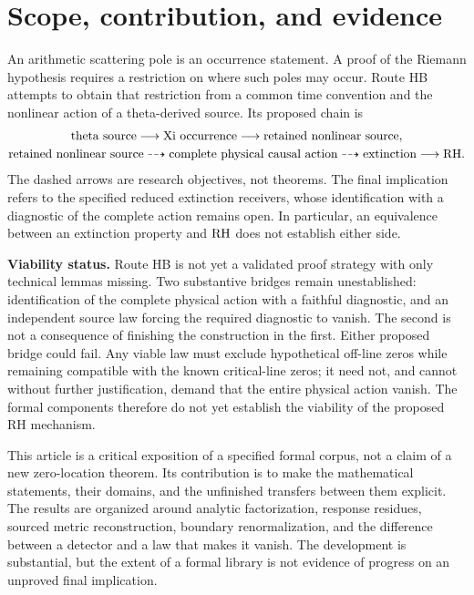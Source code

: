 \section{Scope, contribution, and evidence}

An arithmetic scattering pole is an occurrence statement. A proof of the Riemann hypothesis requires a restriction on where such poles may occur. Route HB attempts to obtain that restriction from a common time convention and the nonlinear action of a theta-derived source. Its proposed chain is
\[
\begin{gathered}
\text{theta source}\longrightarrow\text{Xi occurrence}
\longrightarrow\text{retained nonlinear source},\\
\text{retained nonlinear source}\dashrightarrow\text{complete physical causal action}
\dashrightarrow\text{extinction}\longrightarrow\mathrm{RH}.
\end{gathered}
\]
The dashed arrows are research objectives, not theorems. The final implication refers to the specified reduced extinction receivers, whose identification with a diagnostic of the complete action remains open. In particular, an equivalence between an extinction property and \(\mathrm{RH}\) does not establish either side.

\textbf{Viability status.} Route HB is not yet a validated proof strategy with only technical lemmas missing. Two substantive bridges remain unestablished: identification of the complete physical action with a faithful diagnostic, and an independent source law forcing the required diagnostic to vanish. The second is not a consequence of finishing the construction in the first. Either proposed bridge could fail. Any viable law must exclude hypothetical off-line zeros while remaining compatible with the known critical-line zeros; it need not, and cannot without further justification, demand that the entire physical action vanish. The formal components therefore do not yet establish the viability of the proposed RH mechanism.

This article is a critical exposition of a specified formal corpus, not a claim of a new zero-location theorem. Its contribution is to make the mathematical statements, their domains, and the unfinished transfers between them explicit. The results are organized around analytic factorization, response residues, sourced metric reconstruction, boundary renormalization, and the difference between a detector and a law that makes it vanish. The development is substantial, but the extent of a formal library is not evidence of progress on an unproved final implication.

